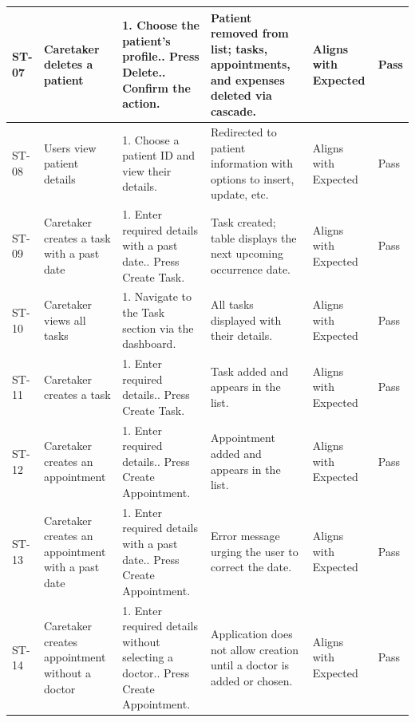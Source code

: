 \documentclass[12pt,a4paper]{article}
\begin{document}
\begin{longtable}{|p{1cm}|p{2.5cm}|p{3.5cm}|p{3.5cm}|p{2cm}|p{1.2cm}|}
    ST-07 & Caretaker deletes a patient &
        1. Choose the patient's profile.\newline
        2. Press Delete.\newline
        3. Confirm the action. &
        Patient removed from list; tasks, appointments, and expenses deleted via cascade. &
        Aligns with Expected & Pass \\
    \hline
 
    ST-08 & Users view patient details &
        1. Choose a patient ID and view their details. &
        Redirected to patient information with options to insert, update, etc. &
        Aligns with Expected & Pass \\
    \hline
 
    ST-09 & Caretaker creates a task with a past date &
        1. Enter required details with a past date.\newline
        2. Press Create Task. &
        Task created; table displays the next upcoming occurrence date. &
        Aligns with Expected & Pass \\
    \hline
 
    ST-10 & Caretaker views all tasks &
        1. Navigate to the Task section via the dashboard. &
        All tasks displayed with their details. &
        Aligns with Expected & Pass \\
    \hline
 
    ST-11 & Caretaker creates a task &
        1. Enter required details.\newline
        2. Press Create Task. &
        Task added and appears in the list. &
        Aligns with Expected & Pass \\
    \hline
 
    ST-12 & Caretaker creates an appointment &
        1. Enter required details.\newline
        2. Press Create Appointment. &
        Appointment added and appears in the list. &
        Aligns with Expected & Pass \\
    \hline
 
    ST-13 & Caretaker creates an appointment with a past date &
        1. Enter required details with a past date.\newline
        2. Press Create Appointment. &
        Error message urging the user to correct the date. &
        Aligns with Expected & Pass \\
    \hline
 
    ST-14 & Caretaker creates appointment without a doctor &
        1. Enter required details without selecting a doctor.\newline
        2. Press Create Appointment. &
        Application does not allow creation until a doctor is added or chosen. &
        Aligns with Expected & Pass \\
    \hline
 

\end{longtable}
\end{document}
